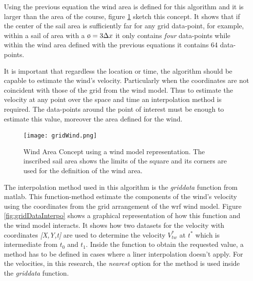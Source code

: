 Using the previous equation the wind area is defined for this algorithm and it is larger than the area of the course, figure \ref{fig:WindAreaSketch} sketch this concept. It shows that if the center of the sail area is sufficiently far for any grid data-point, for example, within a sail of area with a $\clock = 3 \Delta x$ it only contains \textit{four} data-points while within the wind area defined with the previous equations it contains 64 data-points.\par

It is important that regardless the location or time, the algorithm should be capable to estimate the wind's velocity. %
Particularly when the coordinates are not coincident with those of the grid from the wind model. Thus to estimate the velocity at any point over the space and time an interpolation method is required. The data-points around the point of interest must be enough to estimate this value, moreover the area defined for the wind.  \par 

\begin{figure} [hbt!]
    \centering
    \texttt{[image: gridWind.png]}
    \caption{Wind Area Concept using a wind model representation. The inscribed sail area shows the limits of the square and its corners are used for the definition of the wind area.}
    \label{fig:WindAreaSketch}
\end{figure}

The interpolation method used in this algorithm is the \textit{griddata} function from \acrshort{matlab}. This function-method estimate the components of the wind's velocity %
using the coordinates from the grid arrangement of the \acrshort{wrf} wind model. Figure \ref{fig:gridDataInterpo} shows a graphical representation of how this function and the wind model interacts. It shows how two datasets for the velocity with coordinates \textit{[X,Y,t]} are used to determine the velocity $V_{tw}^{*}$ at $t^{*}$ which is intermediate from $t_{0}$ and $t_{1}$. Inside the function to obtain the requested value, a method has to be defined in cases where a liner interpolation doesn't apply. %
For the velocities, in this research, the \textit{nearest} option for the method is used inside the \textit{griddata} function.\par

